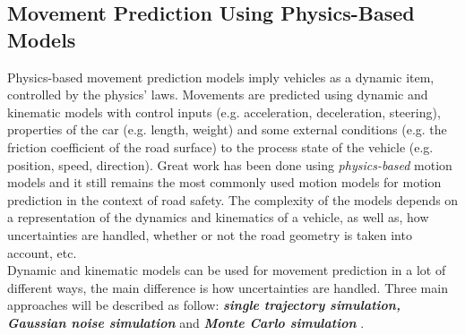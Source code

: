 \subsection{Movement Prediction Using Physics-Based Models}
\label{subsection:phb}

Physics-based movement prediction models imply vehicles as a dynamic item, controlled by the physics' laws. Movements are predicted using dynamic and kinematic models with control inputs (e.g. acceleration, deceleration, steering), properties of the car (e.g. length, weight) and some external conditions (e.g. the friction coefficient of the road surface) to the process state of the vehicle (e.g. position, speed, direction). Great work has been done using \textit{physics-based} motion models and it still remains the most commonly used motion models for motion prediction in the context of road safety. The complexity of the models depends on a representation of the dynamics and kinematics of a vehicle, as well as, how uncertainties are handled, whether or not the road geometry is taken into account, etc. \\
Dynamic and kinematic models can be used for movement prediction in a lot of different ways, the main difference is how uncertainties are handled. Three main approaches will be described as follow: \textbf{\textit{single trajectory simulation, Gaussian noise simulation}} and \textbf{\textit{Monte Carlo simulation}} \cite{ClassificationI}.

